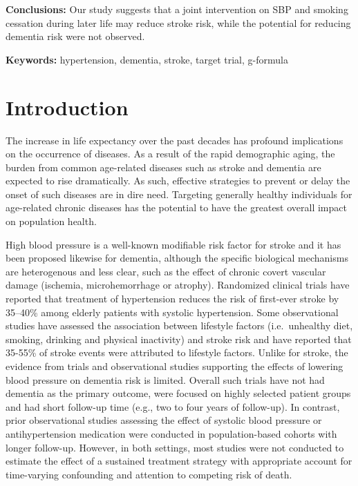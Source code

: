 \documentclass[
]{book}
\begin{document}
\textbf{Conclusions:} Our study suggests that a joint intervention on SBP and smoking cessation during later life may reduce stroke risk, while the potential for reducing dementia risk were not observed.

\textbf{Keywords:} hypertension, dementia, stroke, target trial, g-formula

\newpage

\hypertarget{introduction-1}{%
\section{Introduction}\label{introduction-1}}

The increase in life expectancy over the past decades has profound implications on the occurrence of diseases. As a result of the rapid demographic aging, the burden from common age-related diseases such as stroke and dementia are expected to rise dramatically\autocite{larson2008}. As such, effective strategies to prevent or delay the onset of such diseases are in dire need. Targeting generally healthy individuals for age-related chronic diseases has the potential to have the greatest overall impact on population health\autocite{bauer2014}.

High blood pressure is a well-known modifiable risk factor for stroke\autocite{johnson2019} and it has been proposed likewise for dementia\autocite{lancet2020}, although the specific biological mechanisms are heterogenous and less clear, such as the effect of chronic covert vascular damage (ischemia, microhemorrhage or atrophy)\autocite{hughes2020}. Randomized clinical trials have reported that treatment of hypertension reduces the risk of first-ever stroke by 35--40\% among elderly patients with systolic hypertension\autocite{ace_inhibitors2000,chobanian2003}. Some observational studies have assessed the association between lifestyle factors (i.e.~unhealthy diet, smoking, drinking and physical inactivity) and stroke risk and have reported that 35-55\% of stroke events were attributed to lifestyle factors\autocite{braillon2015,zhang2012,prince1996}. Unlike for stroke, the evidence from trials and observational studies supporting the effects of lowering blood pressure on dementia risk is limited. Overall such trials have not had dementia as the primary outcome, were focused on highly selected patient groups and had short follow-up time (e.g., two to four years of follow-up)\autocite{ace_inhibitors2000,prince1996,forette2002,progress2003,lithell2003,diener2008,anderson2011,williamson2019,ding2020}. In contrast, prior observational studies assessing the effect of systolic blood pressure or antihypertension medication were conducted in population-based cohorts with longer follow-up\autocite{ding2020,liang2018}. However, in both settings, most studies were not conducted to estimate the effect of a sustained treatment strategy with appropriate account for time-varying confounding and attention to competing risk of death.
\end{document}
